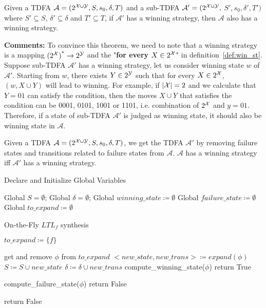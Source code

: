 \begin{theorem}
Given a TDFA $\mathcal{A} =(2^{\mathcal{X} \cup \mathcal{Y}}, S, s_0, \delta, T)$ and a sub-TDFA $\mathcal{A}' =(2^{\mathcal{X} \cup \mathcal{Y}},$ $S',s_0,\delta',T')$ where $S'\subseteq S$, $\delta'\subseteq \delta$ and $T'\subseteq T$, if $\mathcal{A}'$ has a winning strategy, then $\mathcal{A}$ also has a winning strategy. 

\textbf{Comments: } To convince this theorem, we need to note that a winning strategy is a mapping ${(2^{\mathcal{X}})}^*\to 2^{\mathcal{Y}}$ and the "\textbf{for every $X \in 2^{\mathcal{X}}$}" in definition~\ref{def:win_st}. Suppose sub-TDFA $\mathcal{A}'$ has a winning strategy, let us consider winning state $w$ of $\mathcal{A}'$. Starting from $w$, there exists $Y \in 2^{\mathcal{Y}}$ such that for every $X \in2^{\mathcal{X}}$, $(w, X \cup Y)$ will lead to winning. For example, if $|\mathcal{X}| = 2$ and we calculate that $Y = 01$ can satisfy the condition, then the moves $X \cup Y$ that satisfies the condition can be 0001, 0101, 1001 or 1101, i.e. combination of $2^{\mathcal{X}}$ and $y=01$. Therefore, if a state of sub-TDFA $\mathcal{A}'$ is judged as winning state, it should also be winning state in $\mathcal{A}$.
\end{theorem}

\begin{theorem}
Given a TDFA $\mathcal{A} =(2^{\mathcal{X} \cup \mathcal{Y}}, S, s_0, \delta, T)$, we get the TDFA $\mathcal{A}'$ by removing failure states and transitions related to failure states from $\mathcal{A}$. $\mathcal{A}$ has a winning strategy iff $\mathcal{A}'$ has a winning strategy.
\end{theorem}


\iffalse
\begin{algorithm}[h]
\Large
\caption{Declare and Initialize Global Variables}
\label{algo:init}
Global $S=\emptyset$;   
Global $\delta=\emptyset$;  
Global $winning\_state\coloneqq\emptyset$\;
Global $failure\_state\coloneqq\emptyset$\;
Global $to\_expand \coloneqq\emptyset$\;
\end{algorithm}

\begin{algorithm}[h]
\Large
\caption{On-the-Fly $LTL_f$ synthesis}
\label{algo:syn}
$to\_expand \coloneqq\{f\}$\;
{
    get and remove $\phi$ from $to\_expand$\;
    $<new\_state,new\_trans>\coloneqq expand(\phi)$\;
    $S\coloneqq S\cup new\_state$\;
    $\delta\coloneqq \delta\cup new\_trans$\;
    {
        compute\_winning\_state($\phi$)\;
        {
            return True\;
        }
    }
    {
        compute\_failure\_state($\phi$)\;
        {
            return False\;
        }
        
    }
}
return False\;   

\end{algorithm}


